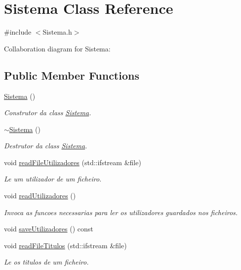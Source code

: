 \hypertarget{class_sistema}{}\section{Sistema Class Reference}
\label{class_sistema}


{\ttfamily \#include $<$Sistema.\+h$>$}



Collaboration diagram for Sistema\+:
\subsection*{Public Member Functions}
\begin{DoxyCompactItemize}
\item 
\mbox{\hyperlink{class_sistema_a815b07845ef6b03247b239333fe75e28}{Sistema}} ()
\begin{DoxyCompactList}\small\item\em Construtor da class \mbox{\hyperlink{class_sistema}{Sistema}}. \end{DoxyCompactList}\item 
\mbox{\hyperlink{class_sistema_aafc86e0f2c3d734fb4c0985f70c27a1a}{$\sim$\+Sistema}} ()
\begin{DoxyCompactList}\small\item\em Destrutor da class \mbox{\hyperlink{class_sistema}{Sistema}}. \end{DoxyCompactList}\item 
void \mbox{\hyperlink{class_sistema_afe05d538e95a0f26d0ddcfd2105de9d3}{read\+File\+Utilizadores}} (std\+::ifstream \&file)
\begin{DoxyCompactList}\small\item\em Le um utilizador de um ficheiro. \end{DoxyCompactList}\item 
void \mbox{\hyperlink{class_sistema_a187636be859f6a6dd7427cb781cd11a5}{read\+Utilizadores}} ()
\begin{DoxyCompactList}\small\item\em Invoca as funcoes necessarias para ler os utilizadores guardados nos ficheiros. \end{DoxyCompactList}\item 
void \mbox{\hyperlink{class_sistema_af25036f1b2d4abc30447c45f3c3237b8}{save\+Utilizadores}} () const
\item 
void \mbox{\hyperlink{class_sistema_a239cd36f933f0ba0bc36e47bd0012af0}{read\+File\+Titulos}} (std\+::ifstream \&file)
\begin{DoxyCompactList}\small\item\em Le os titulos de um ficheiro. \end{DoxyCompactList}\item 

\end{DoxyCompactItemize}
